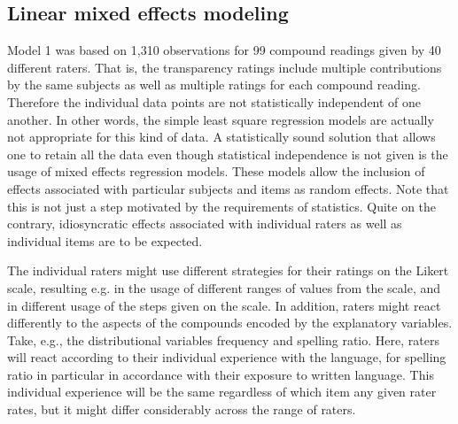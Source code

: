 \subsection{Linear mixed effects modeling}
\label{sec:bell-schaefer-lmer}
Model 1 was based on 1,310 observations for 99 compound readings given by
40 different raters. That is, the transparency ratings include
multiple contributions by the same subjects as well as multiple
ratings for each compound reading. Therefore the individual data points are
not statistically independent of one another. In other words, the
simple least square regression models are actually not appropriate for
this kind of data. A statistically sound solution that allows one to
retain all the data even though statistical independence is not given
is the usage of mixed effects regression models. These models allow
the inclusion of effects associated with particular subjects and items
as random effects.
Note that this is not just a step motivated by the requirements of
statistics. Quite on the contrary, idiosyncratic effects associated
with individual raters as well as individual items are to be
expected. 

The individual raters might use different strategies for their ratings
on the Likert scale, resulting e.g. in the usage of different ranges
of values from the scale, and in different usage of the steps given on
the scale. In addition, raters might react differently to the aspects
of the compounds encoded by the explanatory variables. Take, e.g., the
distributional variables frequency and spelling ratio. Here, raters
will react according to their individual experience with the
language, for spelling ratio in particular in accordance with their
exposure to written language. This individual experience will be the
same regardless of which item any given rater rates, but it might differ
considerably across the range of raters. 

